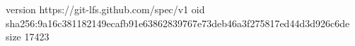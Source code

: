 version https://git-lfs.github.com/spec/v1
oid sha256:9a16c381182149ecafb91e63862839767e73deb46a3f275817ed44d3d926c6de
size 17423
